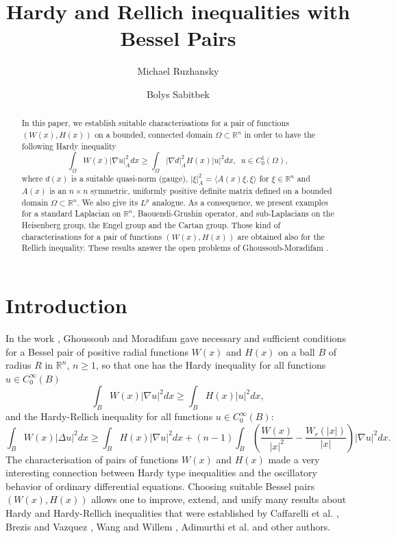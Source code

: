 \documentclass[a4paper,12pt,reqno]{amsart}
\title[Hardy and Rellich inequalities with Bessel Pairs]{Hardy and Rellich inequalities with Bessel Pairs}
\author[Michael Ruzhansky]{Michael Ruzhansky}
\author[Bolys Sabitbek]{Bolys Sabitbek}
\theoremstyle{theorem}
\numberwithin{equation}{section}
\theoremstyle{plain}
\theoremstyle{definition}
\theoremstyle{defi}
\begin{document}
		\begin{abstract}
	In this paper, we establish suitable characterisations for a pair of functions $(W(x),H(x))$ on a bounded, connected domain $\Omega \subset \mathbb{R}^n$ in order to have the following Hardy inequality
	\begin{equation*}
	\int_{\Omega} W(x) |\nabla u|_A^2 dx \geq \int_{\Omega} |\nabla d|^2_AH(x)|u|^2 dx, \,\,\, u \in C^{1}_0(\Omega),
	\end{equation*} 
	where $d(x)$ is a suitable quasi-norm (gauge), $|\xi|^2_A = \langle A(x)\xi, \xi \rangle$ for $\xi \in \mathbb{R}^n$ and $A(x)$ is an $n\times n$ symmetric, uniformly positive definite matrix defined on a bounded domain $\Omega \subset \mathbb{R}^n$. We also give its $L^p$ analogue. As a consequence, we present examples for a standard Laplacian on $\mathbb{R}^n$, Baouendi-Grushin operator, and sub-Laplacians on the Heisenberg group, the Engel group and the Cartan group. Those kind of characterisations for a pair of functions $(W(x),H(x))$ are obtained also for the Rellich inequality. These results answer the open problems of Ghoussoub-Moradifam \cite{GM_book}.
	\end{abstract}
	\maketitle
\section{Introduction}	
In the work \cite{GM11}, Ghoussoub and Moradifam gave necessary and sufficient conditions for a Bessel pair of positive radial functions $W(x)$ and $H(x)$ on a ball $B$ of radius $R$ in $\mathbb{R}^n$, $n\geq 1$, so that one has the Hardy inequality for all functions $u \in C^{\infty}_0(B)$
\begin{equation*}
	\int_{B} W(x) |\nabla u|^2 dx \geq \int_{B} H(x) |u|^2 dx,
\end{equation*}
and the Hardy-Rellich inequality for all functions $u \in C^{\infty}_0(B)$:
\begin{equation*}
	\int_{B} W(x)|\Delta u|^2 dx \geq \int_{B} H(x)|\nabla u|^2 dx +(n-1)\int_{B} \left( \frac{W(x)}{|x|^2}-\frac{W_r(|x|)}{|x|} \right)|\nabla u|^2 dx. 
\end{equation*} 
The characterisation of pairs of functions $W(x)$ and $H(x)$ made a very interesting connection between Hardy type inequalities and the oscillatory behavior of ordinary differential equations. Choosing suitable Bessel pairs $(W(x),H(x))$ allows one to improve, extend, and unify many results about Hardy and Hardy-Rellich inequalities that were established by Caffarelli et al. \cite{CKN84}, Brezis and Vazquez \cite{BV97}, Wang and Willem \cite{WW03}, Adimurthi et al. \cite{ACR02} and other authors.   
  
\end{document}
